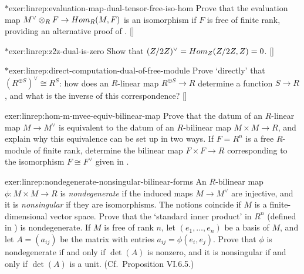 \begin{exer}{$*$}{exer:linrep:evaluation-map-dual-tensor-free-iso-hom}
  Prove that the evaluation map $M^\vee \otimes_R F \to Hom_R(M,F)$
  is an isomorphism if $F$ is free of finite rank, providing an
  alternative proof of
  . []
\end{exer}

\begin{exer}{$*$}{exer:linrep:z2z-dual-is-zero}
  Show that $(Z/2Z)^\vee = Hom_{Z}(Z/2Z, Z) = 0$.
  []
\end{exer}

\begin{exer}{$*$}{exer:linrep:direct-computation-dual-of-free-module}
  Prove `directly' that $(R^{\oplus S})^\vee \cong R^S$: how does an
  $R$-linear map $R^{\oplus S} \to R$ determine a function $S \to R$,
  and what is the inverse of this correspondence?
  []
\end{exer}

\begin{exer}{}{exer:linrep:hom-m-mvee-equiv-bilinear-map}
  Prove that the datum of an $R$-linear map $M \to M^\vee$ is
  equivalent to the datum of an $R$-bilinear map $M \times M \to R$,
  and explain why this equivalence can be set up in two ways. If
  $F = R^n$ is a free $R$-module of finite rank, determine the
  bilinear map $F \times F \to R$ corresponding to the isomorphism
  $F \cong F^\vee$ given in .
\end{exer}

\begin{exer}{}{exer:linrep:nondegenerate-nonsingular-bilinear-forms}
  An $R$-bilinear map $\phi : M \times M \to R$ is
  \emph{nondegenerate} if the induced maps $M \to M^\vee$ are
  injective, and it is \emph{nonsingular} if they are isomorphisms.
  The notions coincide if $M$ is a finite-dimensional vector space.
  Prove that the `standard inner product' in $R^n$ (defined in
  ) is
  nondegenerate. If $M$ is free of rank $n$, let $(e_1, \dots, e_n)$
  be a basis of $M$, and let $A = (a_{ij})$ be the matrix with entries
  $a_{ij} = \phi(e_i, e_j)$. Prove that $\phi$ is nondegenerate if and
  only if $\det(A)$ is nonzero, and it is nonsingular if and only if
  $\det(A)$ is a unit. (Cf.\ Proposition VI.6.5.)
\end{exer}

